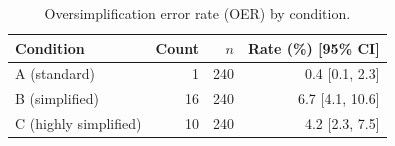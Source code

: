 \begin{table}[H]
\caption{Oversimplification error rate (OER) by condition.}
\label{tab:oer:cond}
\centering
\begin{tabular}{lrrr}
\toprule
Condition & Count & $n$ & Rate (\%) [95\% CI] \\
\midrule
A (standard) & 1 & 240 & 0.4 [0.1, 2.3] \\
B (simplified) & 16 & 240 & 6.7 [4.1, 10.6] \\
C (highly simplified) & 10 & 240 & 4.2 [2.3, 7.5] \\
\bottomrule
\end{tabular}
\end{table}
